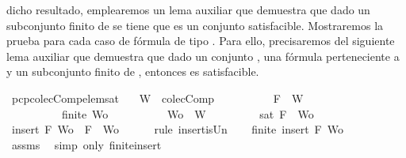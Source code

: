 \begin{isabellebody}
\begin{isamarkuptext}
  dicho resultado, emplearemos un lema auxiliar que demuestra que dado un subconjunto finito  de 
   se tiene que  es un conjunto satisfacible. Mostraremos la prueba para cada
  caso de fórmula de tipo \isa{{\isasymalpha}}. Para ello, precisaremos del siguiente lema auxiliar que demuestra que 
  dado un conjunto ,  una fórmula perteneciente a  y  un subconjunto finito de , 
  entonces  es satisfacible.%
\end{isamarkuptext}\isamarkuptrue%
\isamarkupfalse%
\ pcp{\isacharunderscore}colecComp{\isacharunderscore}elem{\isacharunderscore}sat{\isacharcolon}\isanewline
\ \ \ {\isachardoublequoteopen}W\ {\isasymin}\ colecComp{\isachardoublequoteclose}\isanewline
\ \ \ \ \ \ \ \ \ \ {\isachardoublequoteopen}F\ {\isasymin}\ W{\isachardoublequoteclose}\isanewline
\ \ \ \ \ \ \ \ \ \ {\isachardoublequoteopen}finite\ Wo{\isachardoublequoteclose}\isanewline
\ \ \ \ \ \ \ \ \ \ {\isachardoublequoteopen}Wo\ {\isasymsubseteq}\ W{\isachardoublequoteclose}\isanewline
\ \ \ \ \ \ \ \ \ {\isachardoublequoteopen}sat\ {\isacharparenleft}{\isacharbraceleft}F{\isacharbraceright}\ {\isasymunion}\ Wo{\isacharparenright}{\isachardoublequoteclose}\isanewline
%
\isadelimproof
%
\endisadelimproof
%
\isatagproof
{}\isamarkupfalse%
\ {\isacharminus}\isanewline
\ \ \isamarkupfalse%
\ {}{\isacharcolon}{\isachardoublequoteopen}insert\ F\ Wo\ {\isacharequal}\ {\isacharbraceleft}F{\isacharbraceright}\ {\isasymunion}\ Wo{\isachardoublequoteclose}\isanewline
\ \ \ \ \isamarkupfalse%
\ {\isacharparenleft}rule\ insert{\isacharunderscore}is{\isacharunderscore}Un{\isacharparenright}\isanewline
\ \ \isamarkupfalse%
\ {\isachardoublequoteopen}finite\ {\isacharparenleft}insert\ F\ Wo{\isacharparenright}{\isachardoublequoteclose}\isanewline
\ \ \ \ \isamarkupfalse%
\ assms{\isacharparenleft}{}{\isacharparenright}\ \isamarkupfalse%
\ {\isacharparenleft}simp\ only{\isacharcolon}\ finite{\isacharunderscore}insert{\isacharparenright}\isanewline
\ \ \isamarkupfalse%
\ \isamarkupfalse%

\end{isabellebody}
